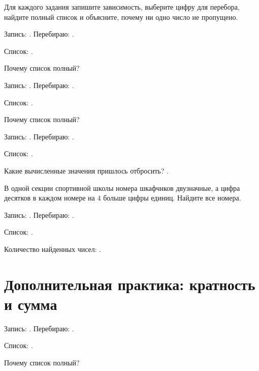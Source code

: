 Для каждого задания запишите зависимость, выберите цифру для перебора,
найдите полный список и объясните, почему ни одно число не пропущено.

\begin{practicebox}
  Запись: \answerblank[32mm]. Перебираю: \answerblank[18mm].

  Список: \answerblank[105mm].

  Почему список полный? 
\end{practicebox}

\begin{practicebox}
  Запись: \answerblank[32mm]. Перебираю: \answerblank[18mm].

  Список: \answerblank[105mm].

  Почему список полный? 
\end{practicebox}

\begin{practicebox}
  Запись: \answerblank[32mm]. Перебираю: \answerblank[18mm].

  Список: \answerblank[105mm].

  Какие вычисленные значения пришлось отбросить? \answerblank[60mm].
\end{practicebox}

\begin{practicebox}
  В одной секции спортивной школы номера шкафчиков двузначные, а цифра
  десятков в каждом номере на \(4\) больше цифры единиц. Найдите все номера.

  Запись: \answerblank[32mm]. Перебираю: \answerblank[18mm].

  Список: \answerblank[105mm].

  Количество найденных чисел: \answerblank[15mm].
\end{practicebox}

\newpage
\section{Дополнительная практика: кратность и сумма}

\begin{practicebox}
  Запись: \answerblank[32mm]. Перебираю: \answerblank[18mm].

  Список: \answerblank[105mm].

  Почему список полный? 
\end{practicebox}

